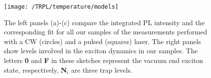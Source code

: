 \begin{figure}
	\centering
	\texttt{[image: /TRPL/temperature/models]} %
	\caption{The left panels (a)-(c) compare the integrated PL intensity and the corresponding fit for all our samples of the measurements performed with a CW (circles) and a pulsed (squares) laser. The right panels show levels involved in the exciton dynamics in our samples. The letters \textbf{0} and \textbf{F} in these sketches represent the vacuum end exciton state, respectively, \textbf{N$_i$} are three trap levels.}
	\label{fig:Arrhenius_PLandTRPL}
\end{figure}
\newpage 